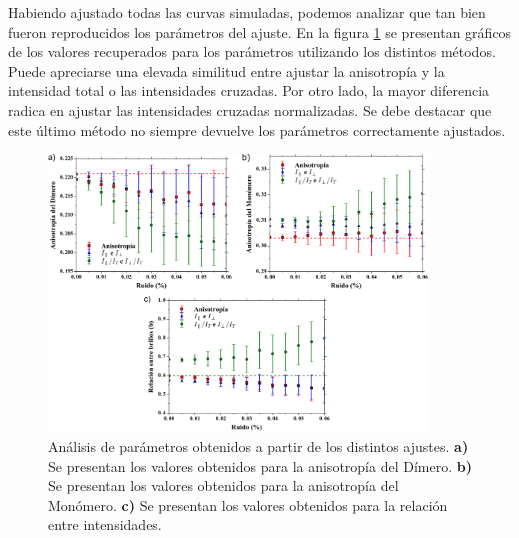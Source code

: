 Habiendo ajustado todas las curvas simuladas, podemos analizar que tan bien fueron reproducidos los parámetros del ajuste. En la figura \ref{fig:fit_Params} se presentan gráficos de los valores recuperados para los parámetros utilizando los distintos métodos. Puede apreciarse una elevada similitud entre ajustar la anisotropía y la intensidad total o las intensidades cruzadas. Por otro lado, la mayor diferencia radica en ajustar las intensidades cruzadas normalizadas. Se debe destacar que este último método no siempre devuelve los parámetros correctamente ajustados.

\begin{figure}
\centering
    \includegraphics[width=0.9\textwidth]{./img/Ajustes_Params.png}
    \caption{Análisis de parámetros obtenidos a partir de los distintos ajustes. \textbf{a)} Se presentan los valores obtenidos para la anisotropía del Dímero. \textbf{b)} Se presentan los valores obtenidos para la anisotropía del Monómero. \textbf{c)} Se presentan los valores obtenidos para la relación entre intensidades.}
    \label{fig:fit_Params}
\end{figure}


